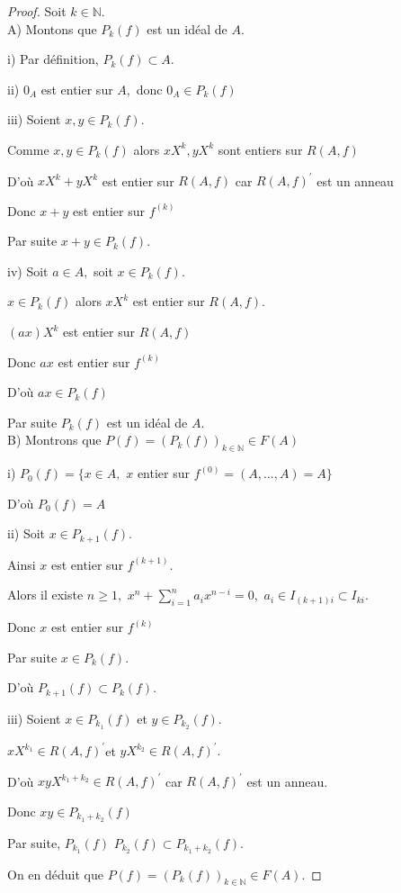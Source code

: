 \begin{proof}
	Soit $k\in \mathbb{N}.$ \\
	A) Montons que $P_{k}(f)$ est un idéal de $A$.
	
	i) Par définition, $P_{k}(f)\subset A.$
	
	ii) $0_{A}$ est entier sur $A,$ donc $0_{A}\in P_{k}(f)$
	
	iii) Soient $x,y\in P_{k}(f).$
	
	Comme $x,y\in P_{k}(f)$ alors $xX^{k},yX^{k}$ sont entiers sur $R(A,f)$
	
	D'où $xX^{k}+yX^{k}$ est entier sur $R(A,f)$ car $R(A,f)^{\prime }$ est
	un anneau
	
	Donc $x+y$ est entier sur $f^{(k)}$
	
	Par suite $x+y\in P_{k}(f).$
	
	iv) Soit $a\in A,$ soit $x\in P_{k}(f).$
	
	$x\in P_{k}(f)$ alors $xX^{k}$ est entier sur $R(A,f).$
	
	$(ax)X^{k}$ est entier sur $R(A,f)$
	
	Donc $ax$ est entier sur $f^{(k)}$
	
	D'où $ax\in P_{k}(f)$
	
	Par suite $P_{k}(f)$ est un idéal de $A.$ \\
	B) Montrons que $P(f)=(P_{k}(f))_{k\in \mathbb{N}}\in F(A)$
	
	i) $P_{0}(f)=\{x\in A,$ $x$ entier sur $f^{(0)}=(A,...,A)=A\}$
	
	D'où $P_{0}(f)=A$
	
	ii) Soit $x\in P_{k+1}(f).$
	
	Ainsi $x$ est entier sur $f^{(k+1)}.$
	
	Alors il existe $n\geq 1,$ $x^{n}+\sum\limits_{i=1}^{n}a_{i}x^{n-i}=0,$ $%
	a_{i}\in I_{(k+1)i}\subset I_{ki}$.
	
	Donc $x$ est entier sur $f^{(k)}$
	
	Par suite $x\in P_{k}(f).$
	
	D'où $P_{k+1}(f)\subset P_{k}(f).$
	
	iii) Soient $x\in P_{k_{1}}(f)$ et $y\in P_{k_{2}}(f)$.
	
	$xX^{k_{1}}\in R(A,f)^{\prime }$et $yX^{k_{2}}\in R(A,f)^{\prime }.$
	
	D'où $xyX^{k_{1}+k_{2}}\in R(A,f)^{\prime }$ car $R(A,f)^{\prime }$ est
	un anneau.
	
	Donc $xy\in P_{k_{1}+k_{2}}(f)$
	
	Par suite, $P_{k_{1}}(f)$ $P_{k_{2}}(f)\subset P_{k_{1}+k_{2}}(f).$
	
	On en déduit que $P(f)=(P_{k}(f))_{k\in \mathbb{N}}\in F(A).$
\end{proof}
